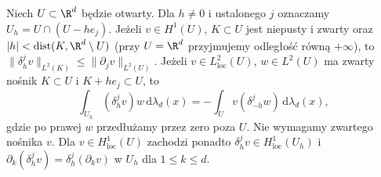 \begin{lemat}
\label{lem:pde15-difference}
Niech $U\subset\R^d$ będzie otwarty. Dla $h\ne0$ i ustalonego
$j$ oznaczamy $U_h=U\cap(U-he_j)$.
Jeżeli $v\in H^1(U)$, $K\subset U$ jest niepusty i zwarty oraz
$|h|<\operatorname{dist}(K,\R^d\setminus U)$
(przy $U=\R^d$ przyjmujemy odległość równą $+\infty$),
to $\|\delta_h^jv\|_{L^2(K)}\le\|\partial_jv\|_{L^2(U)}$.
Jeżeli $v\in L^2_{\mathrm{loc}}(U)$, $w\in L^2(U)$ ma
zwarty nośnik $K\subset U$ i $K+he_j\subset U$, to
\[
 \int_{U_h}(\delta_h^jv)w\,\mathrm d\lambda_d(x)
 =-\int_U v(\delta_{-h}^jw)\,\mathrm d\lambda_d(x),
\]
gdzie po prawej $w$ przedłużamy przez zero poza $U$.
Nie wymagamy zwartego nośnika $v$. Dla
$v\in H^1_{\mathrm{loc}}(U)$ zachodzi ponadto
$\delta_h^jv\in H^1_{\mathrm{loc}}(U_h)$ i
$\partial_k(\delta_h^jv)=\delta_h^j(\partial_kv)$
w $U_h$ dla $1\le k\le d$.
\end{lemat}
